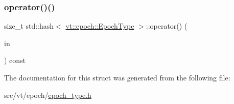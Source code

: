 \subsubsection{\texorpdfstring{operator()()}{operator()()}}
{\footnotesize\ttfamily size\+\_\+t std\+::hash$<$ \hyperlink{structvt_1_1epoch_1_1_epoch_type}{vt\+::epoch\+::\+Epoch\+Type} $>$\+::operator() (\begin{DoxyParamCaption}\item[{\hyperlink{structvt_1_1epoch_1_1_epoch_type}{vt\+::epoch\+::\+Epoch\+Type} const \&}]{in }\end{DoxyParamCaption}) const\hspace{0.3cm}{\ttfamily [inline]}}



The documentation for this struct was generated from the following file\+:\begin{DoxyCompactItemize}
\item 
src/vt/epoch/\hyperlink{epoch__type_8h}{epoch\+\_\+type.\+h}\end{DoxyCompactItemize}
